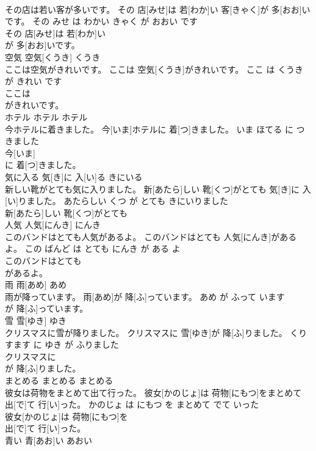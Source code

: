 \documentclass[8pt]{extreport}
\begin{document}
\begin{CJK}{UTF8}{min}
\\	その店は若い客が多いです。	その 店[みせ]は 若[わか]い 客[きゃく]が 多[おお]いです。	その みせ は わかい きゃく が おおい です	
\\	その 店[みせ]は 若[わか]い
\\	が 多[おお]いです。			
\\	空気	空気[くうき]	くうき	
\\	ここは空気がきれいです。	ここは 空気[くうき]がきれいです。	ここ は くうき が きれい です	
\\	ここは
\\	がきれいです。			
\\	ホテル	ホテル	ホテル	
\\	今ホテルに着きました。	今[いま]ホテルに 着[つ]きました。	いま ほてる に つきました	
\\	今[いま]
\\	に 着[つ]きました。			
\\	気に入る	気[き]に 入[い]る	きにいる	
\\	新しい靴がとても気に入りました。	新[あたら]しい 靴[くつ]がとても 気[き]に 入[い]りました。	あたらしい くつ が とても きにいりました	
\\	新[あたら]しい 靴[くつ]がとても
\\	人気	人気[にんき]	にんき	
\\	このバンドはとても人気があるよ。	このバンドはとても 人気[にんき]があるよ。	この ばんど は とても にんき が ある よ	
\\	このバンドはとても
\\	があるよ。			
\\	雨	雨[あめ]	あめ	
\\	雨が降っています。	雨[あめ]が 降[ふ]っています。	あめ が ふって います	
\\	が 降[ふ]っています。			
\\	雪	雪[ゆき]	ゆき	
\\	クリスマスに雪が降りました。	クリスマスに 雪[ゆき]が 降[ふ]りました。	くりすます に ゆき が ふりました	
\\	クリスマスに
\\	が 降[ふ]りました。			
\\	まとめる	まとめる	まとめる	
\\	彼女は荷物をまとめて出て行った。	彼女[かのじょ]は 荷物[にもつ]をまとめて 出[で]て 行[い]った。	かのじょ は にもつ を まとめて でて いった	
\\	彼女[かのじょ]は 荷物[にもつ]を
\\	出[で]て 行[い]った。			
\\	青い	青[あお]い	あおい	

\end{CJK}
\end{document}
